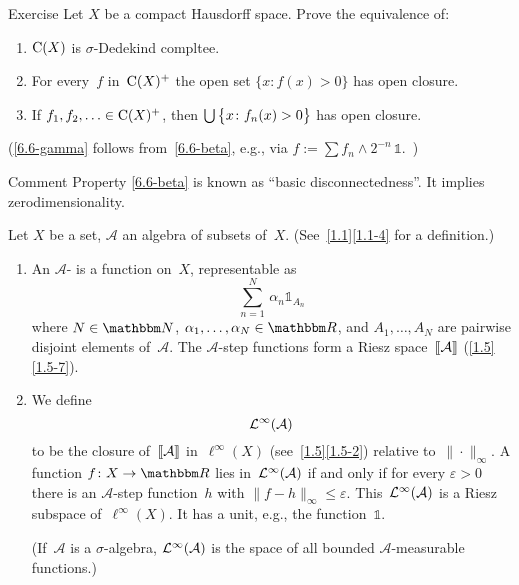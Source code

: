 \documentclass[main.tex]{subfiles}
\begin{document}
%
\begin{psec}{6.6}{Exercise}
Let $X$ be a compact Hausdorff space.
Prove the equivalence of:
\begin{enumerate}[label=(\greek{*})]
\item\label{6.6-alpha}
$\mathrm{C}(X)$ is $\sigma$-Dedekind compltee.
%
\item\label{6.6-beta}
For every~$f$ in~$\mathrm{C}(X)^+$ the open set $\{x\colon f(x)>0\}$
has open closure.
%
\item\label{6.6-gamma}
If $f_1,f_2,\dotsc\in\mathrm{C}(X)^+$,
then $\bigcup\smash{\bigl\{x\colon f_n(x)>0\bigr\}}$ has open closure.
\end{enumerate}

(\ref{6.6-gamma} follows from~\ref{6.6-beta},
e.g., via $f:=\sum f_n\wedge 2^{-n} \, \mathbb{1}$.\ )
\end{psec}
\begin{psec*}{Comment}
Property \ref{6.6-beta} 
is known as ``basic disconnectedness''.
It implies zerodimensionality.
\end{psec*}
%
%
\begin{psec}{6.7}%
Let $X$ be a set, $\mathcal A$ an algebra of subsets of~$X$.
(See~\ref{1.1}\ref{1.1-4} for a definition.)
\begin{enumerate}
\item\label{6.7-1}
An $\mathcal A$-
is a function on~$X$,
representable as
\begin{equation*}
\sum_{n=1}^N \,\alpha_n \mathbb{1}_{A_n}
\end{equation*}
where $N\in\N$, $\alpha_1,\dotsc,\alpha_N\in\R$,
and $A_1,\dotsc,A_N$
are pairwise disjoint elements of~$\mathcal A$.
The $\mathcal A$-step functions form a Riesz space~$\lbb \mathcal A \rbb$
(\ref{1.5}\ref{1.5-7}).
%
\item\label{6.7-2}
We define
\begin{equation*}
\mathcal{L}^\infty(\mathcal{A})
\end{equation*}
to be the closure of~$\lbb\mathcal A\rbb$ in~$\ell^\infty(X)$
(see~\ref{1.5}\ref{1.5-2}) relative to~$\|\cdot\|_\infty$.
A function $f\colon X\ra\R$ lies in~$\mathcal{L}^\infty(\mathcal A)$
if and only if for every $\varepsilon>0$
there is an $\mathcal A$-step function~$h$
with $\|f-h\|_\infty\leq\varepsilon$.
This~$\mathcal{L}^\infty(\mathcal A)$ is a Riesz subspace of~$\ell^\infty(X)$.
It has a unit, e.g., the function~$\mathbb{1}$.

(If~$\mathcal A$ is a $\sigma$-algebra,
$\mathcal{L}^\infty(\mathcal A)$ is the space of
all bounded $\mathcal A$-measurable functions.)
\end{enumerate}
\end{psec}
\end{document}
